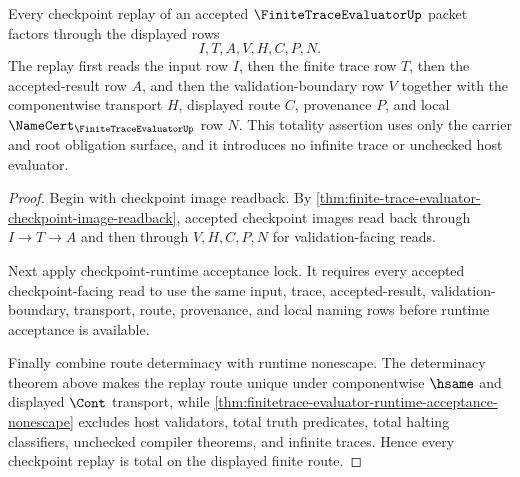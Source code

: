\begin{theorem}
\label{thm:finitetrace-evaluator-checkpoint-replay-totality}
Every checkpoint replay of an accepted $\FiniteTraceEvaluatorUp$ packet
factors through the displayed rows
$$
I,T,A,V,H,C,P,N.
$$
The replay first reads the input row $I$, then the finite trace row $T$, then
the accepted-result row $A$, and then the validation-boundary row $V$ together
with the componentwise transport $H$, displayed route $C$, provenance $P$, and
local $\NameCert_{\FiniteTraceEvaluatorUp}$ row $N$. This totality assertion
uses only the carrier and root obligation surface, and it introduces no
infinite trace or unchecked host evaluator.
\end{theorem}
\begin{proof}
Begin with checkpoint image readback. By
\autoref{thm:finite-trace-evaluator-checkpoint-image-readback}, accepted
checkpoint images read back through $I \to T \to A$ and then through
$V,H,C,P,N$ for validation-facing reads.

Next apply checkpoint-runtime acceptance lock. It requires every accepted
checkpoint-facing read to use the same input, trace, accepted-result,
validation-boundary, transport, route, provenance, and local naming rows before
runtime acceptance is available.

Finally combine route determinacy with runtime nonescape. The determinacy
theorem above makes the replay route unique under componentwise $\hsame$ and
displayed $\Cont$ transport, while
\autoref{thm:finitetrace-evaluator-runtime-acceptance-nonescape} excludes
host validators, total truth predicates, total halting classifiers, unchecked
compiler theorems, and infinite traces. Hence every checkpoint replay is total
on the displayed finite route.
\end{proof}
